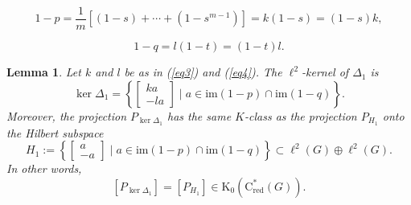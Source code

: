 \documentclass[10pt,a4paper]{amsart}
\newtheorem{lemma}{Lemma}
\newcommand{\Csr}{\mathrm{C}^*_{\text{red}}}
\begin{document}
	\begin{equation}
		\label{eq3}
		1-p = \frac{1}{m}[(1-s)+\cdots+(1-s^{m-1})] =
		k(1-s)=(1-s)k,
	\end{equation}

	\begin{equation}
		\label{eq4}
		1-q = l(1-t)=(1-t)l.
	\end{equation}

	\begin{lemma}
		\label{lem:projker}
		Let $k$ and $l$ be as in (\ref{eq3}) and (\ref{eq4}). The $\ell^2$-kernel of $\Delta_1$ is   
		\[
		\ker\Delta_1
		=
		\left\{\begin{bmatrix}ka\\ -la\end{bmatrix} \mid  a\in \mathrm{im}(1-p)\cap\mathrm{im}(1-q)\right\}.
		\] 
		Moreover, the projection $P_{\ker \Delta_1}$ has the same $K$-class as the projection $P_{H_1}$ onto the Hilbert subspace 
		\begin{equation}
			\label{eq:H1}
			H_1:=\left\{\begin{bmatrix}a\\ -a\end{bmatrix} \mid  a\in \mathrm{im}(1-p)\cap\mathrm{im}(1-q)\right\}
			\subset \ell^2(G)\oplus \ell^2(G).
		\end{equation}
		In other words,  
		\[
			[P_{\ker\Delta_1}]=[P_{H_1}]\in \mathrm K_0(\Csr(G)).
		\]
	\end{lemma}
\end{document}
